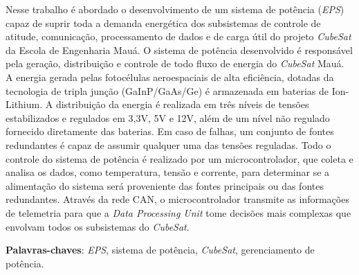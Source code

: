 \documentclass[
	12pt,				%
	openright,			%
	oneside,			%
	a4paper,			%
	english,			%
	french,				%
	spanish,			%
	brazil,				%
	oldfontcommands
	]{abntex2}
\begin{document}
\setlength{\absparsep}{18pt} %
\begin{resumo}
 
	Nesse trabalho é abordado o desenvolvimento de um sistema de potência (\textit{EPS}) capaz de suprir toda a demanda energética dos subsistemas de controle de atitude, comunicação, processamento de dados e de carga útil do projeto \textit{CubeSat} da Escola de Engenharia Mauá. O sistema de potência desenvolvido é responsável pela geração, distribuição e controle de todo fluxo de energia do \textit{CubeSat} Mauá. A energia gerada pelas fotocélulas aeroespaciais de alta eficiência, dotadas da tecnologia de tripla junção (GaInP/GaAs/Ge) é armazenada em baterias de Ion-Lithium. A distribuição da energia é realizada em três níveis de tensões estabilizados e regulados em 3,3V, 5V e 12V, além de um nível não regulado fornecido diretamente das baterias. Em caso de falhas, um conjunto de fontes redundantes é capaz de assumir qualquer uma das tensões reguladas. Todo o controle do sistema de potência é realizado por um microcontrolador, que coleta e analisa os dados, como temperatura, tensão e corrente, para determinar se a alimentação do sistema será proveniente das fontes principais ou das fontes redundantes. Através da rede CAN, o microcontrolador transmite as informações de telemetria para que a \textit{Data Processing Unit} tome decisões mais complexas que envolvam todos os subsistemas do \textit{CubeSat}.
	
	\vspace{\onelineskip}

 \noindent 
 \textbf{Palavras-chaves}: \textit{EPS}, sistema de potência, \textit{CubeSat}, gerenciamento de potência.
\end{resumo}
\end{document}
